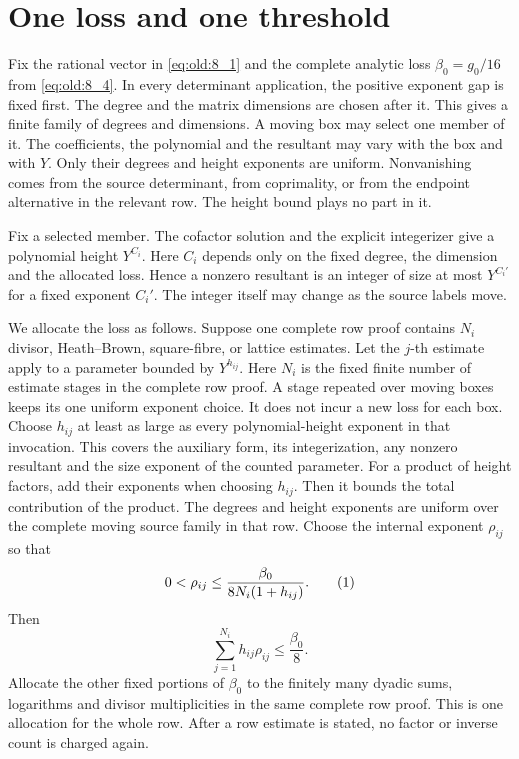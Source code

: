 \section{One loss and one threshold}\label{sec:epsilon}

Fix the rational vector in \eqref{eq:old:8_1} and the complete analytic loss
\(\beta_0=g_0/16\) from \eqref{eq:old:8_4}. In every determinant application, the positive exponent gap is fixed
first. The degree and the matrix dimensions are chosen after it. This
gives a finite family of degrees and dimensions. A moving box may select
one member of it. The coefficients, the polynomial and the resultant may
vary with the box and with \(Y\). Only their degrees and height exponents
are uniform. Nonvanishing comes from the source determinant, from
coprimality, or from the endpoint alternative in the relevant row. The
height bound plays no part in it.

Fix a selected member. The cofactor solution and the explicit
integerizer give a polynomial height \(Y^{C_i}\). Here \(C_i\) depends
only on the fixed degree, the dimension and the allocated loss. Hence a
nonzero resultant is an integer of size at most \(Y^{C_i'}\)
for a fixed exponent \(C_i'\). The integer itself may change as the
source labels move.

We allocate the loss as follows. Suppose one complete row proof contains
\(N_i\) divisor, Heath--Brown, square-fibre, or lattice estimates. Let
the \(j\)-th estimate apply to a parameter bounded by \(Y^{h_{ij}}\).
Here \(N_i\) is the fixed finite number of estimate stages in the complete
row proof. A stage repeated over moving boxes keeps its one uniform
exponent choice. It does not incur a new loss for each box.
Choose \(h_{ij}\) at least as large as every polynomial-height exponent in
that invocation. This covers the auxiliary form, its integerization, any
nonzero resultant and the size exponent of the counted parameter.
For a product of height factors, add their exponents when choosing
\(h_{ij}\). Then it bounds the total contribution of the product.
The degrees and height exponents are uniform over the complete moving
source family in that row.
Choose the internal exponent \(\rho_{ij}\) so that
\[
0<\rho_{ij}\le
\frac{\beta_0}{8N_i(1+h_{ij})}.
\AutoTag{eq:old:9_1}
\]
Then
\[
\sum_{j=1}^{N_i}h_{ij}\rho_{ij}\le\frac{\beta_0}{8}.
\]
Allocate the other fixed portions of \(\beta_0\) to the finitely many
dyadic sums, logarithms and divisor multiplicities in the same complete
row proof. This is one allocation for the whole row. After a row
estimate is stated, no factor or inverse count is charged again.

